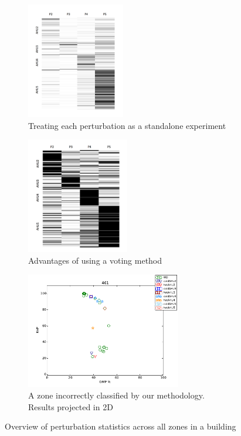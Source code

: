 \begin{figure}[ht!]
\centering
        \begin{subfigure}{0.30\textwidth}
                \centering
                \includegraphics[width=\textwidth,height=2.0in]{./figs/columnnormalized.png}
                \caption{Treating each perturbation as a standalone experiment}
                \label{fig:columnnormalized}
        \end{subfigure}
        \hfill
        \begin{subfigure}{0.30\textwidth}
                \centering
                \includegraphics[width=\textwidth,height=2.0in]{./figs/rownormalized.png}
                \caption{Advantages of using a voting method}
                \label{fig:rownormalized}
        \end{subfigure}
        \hfill
                \begin{subfigure}{0.30\textwidth}
                \centering
                \includegraphics[width=\textwidth,height=2.0in]{./figs/incorrectzone.pdf}
                \caption{A zone incorrectly classified by our methodology. Results projected in 2D}
                \label{fig:incorrectzone}
        \end{subfigure}
\caption{Overview of perturbation statistics across all zones in a building}
\label{fig:active-learning}
\end{figure}

